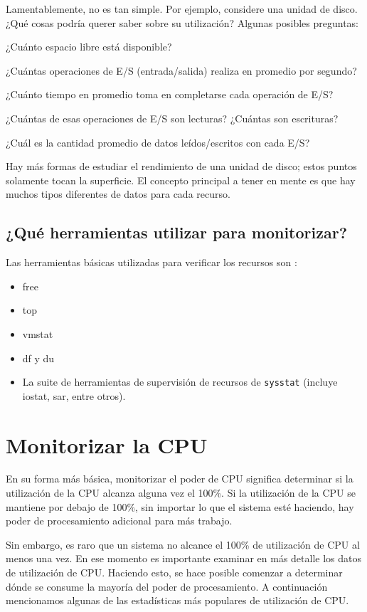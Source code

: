 \documentclass[12pt]{article}
\begin{document}
Lamentablemente, no es tan simple. Por ejemplo, considere una unidad de 
disco. ¿Qué cosas podría querer saber sobre su utilización? Algunas posibles
preguntas: 

¿Cuánto espacio libre está disponible?

¿Cuántas operaciones de E/S (entrada/salida) realiza en promedio por
segundo?

¿Cuánto tiempo en promedio toma en completarse cada operación de E/S?

¿Cuántas de esas operaciones de E/S son lecturas? ¿Cuántas son escrituras?

¿Cuál es la cantidad promedio de datos leídos/escritos con cada E/S?

Hay más formas de estudiar el rendimiento de una unidad de disco; estos 
puntos solamente tocan la superficie. El concepto principal a tener en 
mente es que hay muchos tipos diferentes de datos para cada recurso.


\subsection*{¿Qué herramientas utilizar para monitorizar?}

Las herramientas básicas utilizadas para verificar los recursos son :
\begin{itemize}
\item free
\item top
\item vmstat
\item df y du 
\item La suite de herramientas de supervisión de recursos de 
\texttt{sysstat} (incluye iostat, sar, entre otros). 
\end{itemize}


\section*{Monitorizar la CPU}
En su forma más básica, monitorizar el poder de CPU significa determinar si
 la utilización de la CPU alcanza alguna vez el 100\%. Si la utilización 
de la CPU se mantiene por debajo de 100\%, sin importar lo que el sistema 
esté haciendo, hay poder de procesamiento adicional para más trabajo.

Sin embargo, es raro que un sistema no alcance el 100\% de utilización de 
CPU al menos una vez. En ese momento es importante examinar en más detalle 
los datos de utilización de CPU. Haciendo esto, se hace posible comenzar a 
determinar dónde se consume la mayoría del poder de procesamiento. A 
continuación mencionamos algunas de las estadísticas más populares de 
utilización de CPU.
\end{document}
